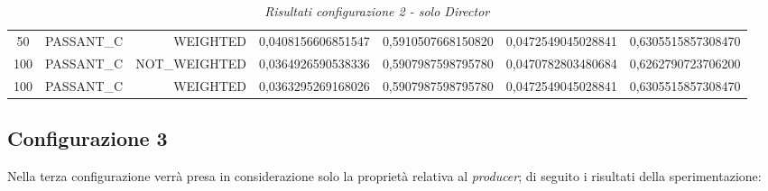 \begin{table}[H]
{\begin{tabular}{ c l r c c c c }
				50 &  PASSANT\_C &   WEIGHTED & 0,0408156606851547 & 0,5910507668150820 & 0,0472549045028841 & 0,6305515857308470 \\
				
				100 &  PASSANT\_C & NOT\_WEIGHTED & 0,0364926590538336 & 0,5907987598795780 & 0,0470782803480684 & 0,6262790723706200 \\
				
				100 &  PASSANT\_C &   WEIGHTED & 0,0363295269168026 & 0,5907987598795780 & 0,0472549045028841 & 0,6305515857308470 \\
			\bottomrule
		\end{tabular}  
	}
	\caption{\emph{Risultati configurazione 2 - solo Director}}
\end{table} 


\subsection{Configurazione 3}
Nella terza configurazione verrà presa in considerazione solo la proprietà relativa al \emph{producer}; di seguito i risultati della sperimentazione:

